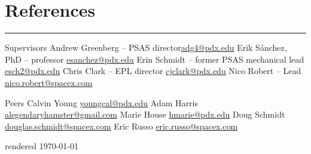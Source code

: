 \section{References}
\noindent\rule{\textwidth}{\hlinewidth}
	\begin{innerlist}
	\item Supervisors
		\subitem Andrew Greenberg -- PSAS director\hfill\href{mailto:adg4@pdx.edu}{adg4@pdx.edu}
		\subitem Erik S\'anchez, PhD -- professor \hfill\href{mailto:esanchez@pdx.edu}{esanchez@pdx.edu}
		\subitem Erin Schmidt -- former PSAS mechanical lead \hfill\href{mailto:esch2@pdx.edu}{esch2@pdx.edu}
		\subitem Chris Clark -- EPL director \hfill\href{mailto:cjclark@pdx.edu}{cjclark@pdx.edu}
		\subitem Nico Robert -- Lead \hfill\href{mailto:nico.robert@spacex.com}{nico.robert@spacex.com}
	\item Peers
		\subitem Calvin Young \hfill\href{mailto:youngcal@pdx.edu}{youngcal@pdx.edu}
		\subitem Adam Harris \hfill\href{mailto:alegendaryhamster@gmail.com}{alegendaryhamster@gmail.com}
		\subitem Marie House \hfill\href{mailto:hmarie@pdx.edu}{hmarie@pdx.edu}
		\subitem Doug Schmidt \hfill\href{mailto:douglas.schmidt@spacex.com}{douglas.schmidt@spacex.com}
		\subitem Eric Russo \hfill\href{mailto:eric.russo@spacex.com}{eric.russo@spacex.com}
	\end{innerlist}

\vfill
\centering rendered \today

